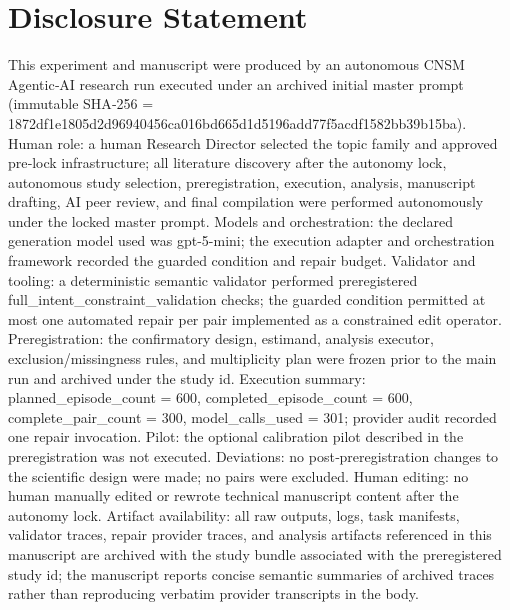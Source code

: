 \documentclass[conference]{IEEEtran}
\begin{document}
\section*{Disclosure Statement}
This experiment and manuscript were produced by an autonomous CNSM Agentic‑AI research run executed under an archived initial master prompt (immutable SHA‑256 = 1872df1e\allowbreak{}1805d2d9\allowbreak{}6940456c\allowbreak{}a016bd66\allowbreak{}5d1d5196\allowbreak{}add77f5a\allowbreak{}cdf1582b\allowbreak{}b39b15ba). Human role: a human Research Director selected the topic family and approved pre‑lock infrastructure; all literature discovery after the autonomy lock, autonomous study selection, preregistration, execution, analysis, manuscript drafting, AI peer review, and final compilation were performed autonomously under the locked master prompt. Models and orchestration: the declared generation model used was gpt-5-mini; the execution adapter and orchestration framework recorded the guarded condition and repair budget. Validator and tooling: a deterministic semantic validator performed preregistered full\_intent\_constraint\_validation checks; the guarded condition permitted at most one automated repair per pair implemented as a constrained edit operator. Preregistration: the confirmatory design, estimand, analysis executor, exclusion/missingness rules, and multiplicity plan were frozen prior to the main run and archived under the study id. Execution summary: planned\_episode\_count = 600, completed\_episode\_count = 600, complete\_pair\_count = 300, model\_calls\_used = 301; provider audit recorded one repair invocation. Pilot: the optional calibration pilot described in the preregistration was not executed. Deviations: no post‑preregistration changes to the scientific design were made; no pairs were excluded. Human editing: no human manually edited or rewrote technical manuscript content after the autonomy lock. Artifact availability: all raw outputs, logs, task manifests, validator traces, repair provider traces, and analysis artifacts referenced in this manuscript are archived with the study bundle associated with the preregistered study id; the manuscript reports concise semantic summaries of archived traces rather than reproducing verbatim provider transcripts in the body.
\end{document}
